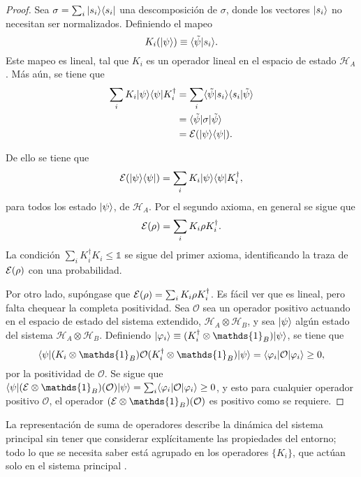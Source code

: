 \begin{proof}
Sea $\sigma=\sum_i|s_i\rangle \langle s_i|$ una descomposición de $\sigma$, donde los vectores $|s_i\rangle$ no necesitan ser normalizados. Definiendo el mapeo \[K_i(|\psi\rangle) \equiv \langle\tilde{\psi}|s_i\rangle.\] Este mapeo es lineal, tal que $K_i$ es un operador lineal en el espacio de estado $\mathcal{H}_A$. Más aún, se tiene que 
\begin{equation}
    \begin{split}
       \sum_i K_i |\psi \rangle \langle \psi |K_i^\dagger&=\sum_i  \langle\tilde{\psi}|s_i\rangle \langle s_i|\tilde{\psi}\rangle\\
        &=\langle \tilde \psi |\sigma |\tilde{\psi}\rangle\\
        &=\mathcal{E}(|\psi \rangle \langle\psi|).\\
    \end{split}
\end{equation}



De ello se tiene que  \[\mathcal{E}(|\psi\rangle \langle \psi|)=\sum_i K_i |\psi \rangle \langle \psi |K_i^\dagger,\] para todos los estado $|\psi\rangle$, de $\mathcal{H}_A$. Por el segundo axioma, en general se sigue que \[\mathcal{E}(\rho)=\sum_i K_i \rho K_i^\dagger.\] La condición $\sum_i K_i^\dagger K_i\le \mathds{1}$ se sigue del primer axioma, identificando la traza de $\mathcal{E}(\rho) $ con una probabilidad.


Por otro lado, supóngase que $\mathcal{E}(\rho)=\sum_i K_i \rho K_i^\dagger$. Es fácil ver que es lineal, pero falta chequear la completa positividad. Sea $\mathcal{O}$ sea un operador positivo actuando en el espacio de estado del sistema extendido, $\mathcal{H}_A\otimes \mathcal{H}_B$, y sea $|\psi \rangle$ algún estado del sistema $\mathcal{H}_A\otimes \mathcal{H}_B$. Definiendo $|\varphi_i\ra \equiv (K_i^\dagger \otimes \mathds{1}_B)|\psi\ra$, se tiene que \[\la \psi |(K_i \otimes \mathds{1}_B)\mathcal{O}(K_i^\dagger \otimes \mathds{1}_B)|\psi\ra=\la \varphi_i |\mathcal{O}|\varphi_i\ra \ge 0,\] por la positividad de $\mathcal{O}$. Se sigue que $\la \psi| (\E \otimes \mathds{1}_B)(\mathcal{O})|\psi\ra=\sum_i \la \varphi_i|\mathcal{O}|\varphi_i\ra \ge 0$, y esto para cualquier operador positivo $\mathcal{O}$, el operador $(\E\otimes \mathds{1}_B)(\mathcal{O})$ es positivo como se requiere.
\end{proof}

La representación de suma de operadores describe la dinámica del sistema principal sin tener que considerar explícitamente las propiedades del entorno; todo lo que se necesita saber está agrupado en los operadores $\{K_i\}$, que actúan solo en el sistema principal {\cite{nielsen_chuang_2010}}.



